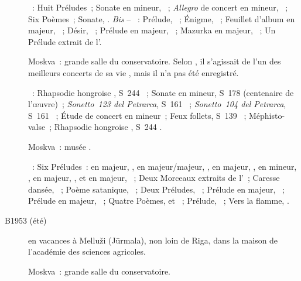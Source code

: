 \begin{description}
 \textsc{\Scriabine{}}~: Huit Préludes~; Sonate en \kF \Sharp mineur,
 ~; \emph{Allegro} de concert en \kB \Flat mineur, ~; Six
 Poèmes~; Sonate, .
 \emph{Bis} -- \textsc{\Scriabine{}}~: Prélude,  ~;
 Énigme,  ~; Feuillet d'album en \kE \Flat majeur,
  ~; Désir,  ~; Prélude en \kA \Flat
 majeur,  ~; Mazurka en \kF \Sharp majeur, 
 ~; Un Prélude extrait de l'.
 \item[\DateWithWeekDay{1953-05-30}]\label{rec:1953-05-30}
 Moskva~: grande salle du conservatoire.
 Selon \VSofronitsky{}, il s'agissait de l'un des meilleurs concerts de sa
 vie \citep[voir][p.~175]{Nekrasova08}, mais il n'a pas été enregistré.

 \textsc{\Liszt{}}~: Rhapsodie hongroise , S~244 ~;
 Sonate en \kB mineur, S~178 (centenaire de l'œuvre)~; \emph{Sonetto~123 del
 Petrarca}, S~161 ~; \emph{Sonetto~104 del Petrarca}, S~161
 ~; Étude de concert en \kF mineur~; Feux follets, S~139
 ~; Méphisto-valse~; Rhapsodie hongroise , S~244
 .
 \item[\DateWithWeekDay{1953-07-08}]
 Moskva~: musée \Scriabine{}.

 \textsc{\Scriabine{}}~: Six Préludes~: en \kF \Sharp majeur, 
 , en \kD \Flat majeur/\kC majeur,  , en \kD
 \Flat majeur,  , en \kB \Flat mineur, 
 , en \kF \Sharp majeur,  , et en \kC majeur,
  ~; Deux Morceaux extraits de l'~; Caresse
 dansée,  ~; Poème satanique, ~; Deux Préludes,
 ~; Prélude en \kG majeur,  ~; Prélude en \kE
 \Flat majeur,  ~; Quatre Poèmes,  et
 ~; Prélude,  ~; Vers la flamme, .
 \item[B1953 (été)]
 \VSofronitsky{} en vacances à Melluži (Jūrmala), non loin de Riga, dans la
 maison de l'académie des sciences agricoles.
 \item[\DateWithWeekDay{1953-10-15}]
 Moskva~: grande salle du conservatoire.


\end{description}
